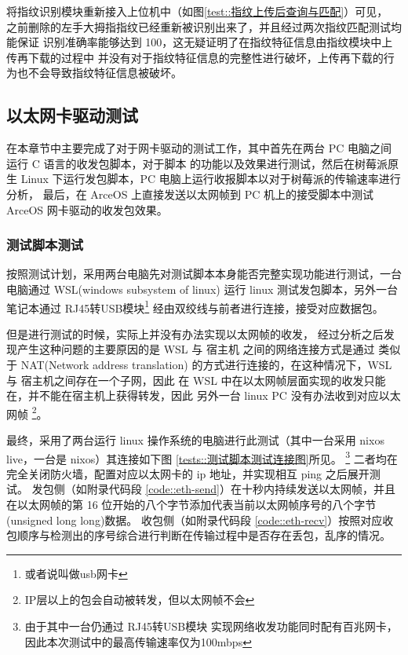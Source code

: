     将指纹识别模块重新接入上位机中（如图\ref{test::指纹上传后查询与匹配}）可见，
    之前删除的左手大拇指指纹已经重新被识别出来了，并且经过两次指纹匹配测试均能保证
    识别准确率能够达到 100，这无疑证明了在指纹特征信息由指纹模块中上传再下载的过程中
    并没有对于指纹特征信息的完整性进行破坏，上传再下载的行为也不会导致指纹特征信息被破坏。

    \subsection{以太网卡驱动测试}

    在本章节中主要完成了对于网卡驱动的测试工作，其中首先在两台 PC 电脑之间运行 C 语言的收发包脚本，对于脚本
    的功能以及效果进行测试，然后在树莓派原生 Linux 下运行发包脚本，PC 电脑上运行收报脚本以对于树莓派的传输速率进行分析，
    最后，在 ArceOS 上直接发送以太网帧到 PC 机上的接受脚本中测试 ArceOS 网卡驱动的收发包效果。

    \subsubsection{测试脚本测试}

    按照测试计划，采用两台电脑先对测试脚本本身能否完整实现功能进行测试，一台电脑通过 WSL(windows subsystem of linux) 
    运行 linux 测试发包脚本，另外一台笔记本通过 RJ45转USB模块\footnote{或者说叫做usb网卡}
    经由双绞线与前者进行连接，接受对应数据包。

    但是进行测试的时候，实际上并没有办法实现以太网帧的收发，
    经过分析之后发现产生这种问题的主要原因的是 WSL 与 宿主机 之间的网络连接方式是通过
    类似于 NAT(Network address translation) 的方式进行连接的，在这种情况下，WSL 与 宿主机之间存在一个子网，因此
    在 WSL 中在以太网帧层面实现的收发只能在，并不能在宿主机上获得转发，因此
    另外一台 linux PC 没有办法收到对应以太网帧
    \footnote{IP层以上的包会自动被转发，但以太网帧不会}。

    最终，采用了两台运行 linux 操作系统的电脑进行此测试（其中一台采用 nixos live，一台是 nixos）其连接如下图 \ref{tests::测试脚本测试连接图}所见。
    \footnote{由于其中一台仍通过 RJ45转USB模块 实现网络收发功能同时配有百兆网卡，因此本次测试中的最高传输速率仅为100mbps}
    二者均在完全关闭防火墙，配置对应以太网卡的 ip 地址，并实现相互 ping 之后展开测试。
    发包侧（如附录代码段 \ref{code::eth-send}）在十秒内持续发送以太网帧，并且在以太网帧的第 16 位开始的八个字节添加代表当前以太网帧序号的八个字节 (unsigned long long)数据。
    收包侧（如附录代码段 \ref{code::eth-recv}）按照对应收包顺序与检测出的序号综合进行判断在传输过程中是否存在丢包，乱序的情况。

